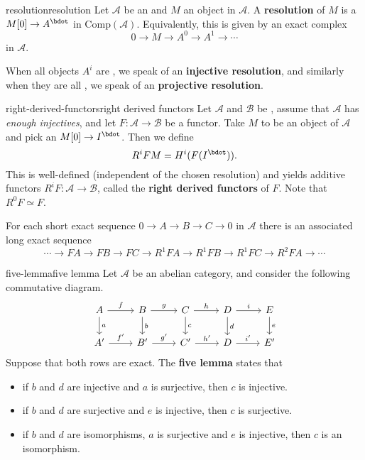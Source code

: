 \begin{topic}{resolution}{resolution}
    Let $\mathcal{A}$ be an  and $M$ an object in $\mathcal{A}$. A \textbf{resolution} of $M$ is a  $M[0] \to A^\bdot$ in $\text{Comp}(\mathcal{A})$. Equivalently, this is given by an exact complex
    \[ 0 \to M \to A^0 \to A^1 \to \cdots \]
    in $\mathcal{A}$.
    
    When all objects $A^i$ are , we speak of an \textbf{injective resolution}, and similarly when they are all , we speak of an \textbf{projective resolution}.
\end{topic}

\begin{topic}{right-derived-functors}{right derived functors}
    Let $\mathcal{A}$ and $\mathcal{B}$ be , assume that $\mathcal{A}$ has \textit{enough injectives}, and let $F : \mathcal{A} \to \mathcal{B}$ be a  functor. Take $M$ to be an object of $\mathcal{A}$ and pick an  $M[0] \to I^\bdot$. Then we define
    \[ R^i F M = H^i(F(I^\bdot)) . \]
    This is well-defined (independent of the chosen resolution) and yields additive functors $R^i F : \mathcal{A} \to \mathcal{B}$, called the \textbf{right derived functors} of $F$. Note that $R^0 F \simeq F$.
    
    For each short exact sequence $0 \to A \to B \to C \to 0$ in $\mathcal{A}$ there is an associated long exact sequence
    \[ \cdots \to FA \to FB \to FC \to R^1FA \to R^1FB \to R^1FC \to R^2FA \to \cdots \]
\end{topic}

\begin{topic}{five-lemma}{five lemma}
    Let $\mathcal{A}$ be an abelian category, and consider the following commutative diagram.
    \[ \begin{tikzcd} A \arrow{r}{f} \arrow{d}{a} & B \arrow{r}{g} \arrow{d}{b} & C \arrow{r}{h} \arrow{d}{c} & D \arrow{r}{i} \arrow{d}{d} & E \arrow{d}{e} \\ A' \arrow{r}{f'} & B' \arrow{r}{g'} & C' \arrow{r}{h'} & D \arrow{r}{i'} & E' \end{tikzcd} \]
    Suppose that both rows are exact. The \textbf{five lemma} states that
    \begin{itemize}
        \item if $b$ and $d$ are injective and $a$ is surjective, then $c$ is injective.
        
        \item if $b$ and $d$ are surjective and $e$ is injective, then $c$ is surjective.
        
        \item if $b$ and $d$ are isomorphisms, $a$ is surjective and $e$ is injective, then $c$ is an isomorphism.
    \end{itemize}
\end{topic}


